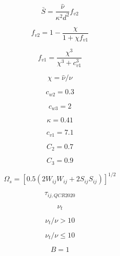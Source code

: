 \begin{equation}
\bar S = \frac{\hat \nu}{\kappa^2 d^2} f_{v2}
\end{equation}

\begin{equation}
f_{v2} = 1 - \frac{\chi}{1 + \chi f_{v1}}
\end{equation}

\begin{equation}
f_{v1} = \frac{\chi^3}{\chi^3 + c_{v1}^3}
\end{equation}

\begin{equation}
\chi = \hat \nu / \nu
\end{equation}

\begin{equation}
c_{w2}=0.3
\end{equation}

\begin{equation}
c_{w3}=2
\end{equation}

\begin{equation}
\kappa=0.41
\end{equation}

\begin{equation}
c_{v1}=7.1
\end{equation}

\begin{equation}
C_2=0.7
\end{equation}

\begin{equation}
C_3=0.9
\end{equation}

\begin{equation}
\Omega_s = [0.5(2 W_{ij}W_{ij}+2 S_{ij}S_{ij})]^{1/2}
\end{equation}

\begin{equation}
\tau_{ij,QCR2020}
\end{equation}

\begin{equation}
\nu_t
\end{equation}

\begin{equation}
\nu_t / \nu > 10
\end{equation}

\begin{equation}
\nu_t / \nu \leq 10
\end{equation}

\begin{equation}
B=1
\end{equation}


